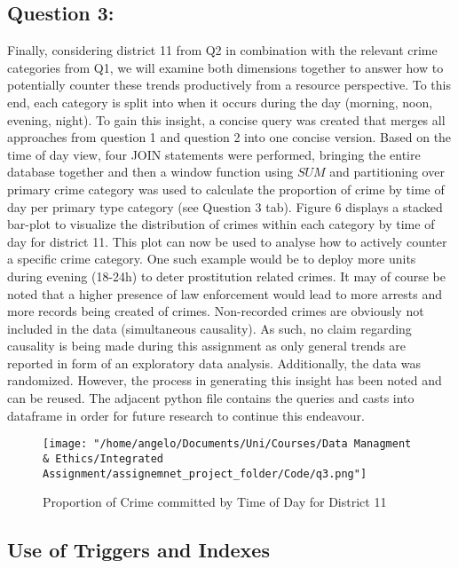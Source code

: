 \documentclass[a4paper]{article}
\begin{document}
 



\subsection{Question 3:}



Finally, considering district 11 from Q2 in combination with the relevant crime categories from Q1, we will examine both dimensions together to answer how to potentially counter these trends productively from a resource perspective. To this end, each category is split into when it occurs during the day (morning, noon, evening, night).
To gain this insight, a concise query was created that merges all approaches from question 1 and question 2 into one concise version. Based on the time of day view, four JOIN statements were performed, bringing the entire database together and then a window function using $SUM$ and partitioning over primary crime category was used to calculate the proportion of crime by time of day per primary type category (see Question 3 tab).
Figure 6 displays a stacked bar-plot to visualize the distribution of crimes within each category by time of day for district 11. This plot can now be used to analyse how to actively counter a specific crime category. One such example would be to deploy more units during evening (18-24h) to deter prostitution related crimes. It may of course be noted that a higher presence of law enforcement would lead to more arrests and more records being created of crimes. Non-recorded crimes are obviously not included in the data (simultaneous causality). As such, no claim regarding causality is being made during this assignment as only general trends are reported in form of an exploratory data analysis. Additionally, the data was randomized. However, the process in generating this insight has been noted and can be reused. The adjacent python file contains the queries and casts into dataframe in order for future research to continue this endeavour. 


\begin{figure}[htp]
		\centering
			\texttt{[image: "/home/angelo/Documents/Uni/Courses/Data Managment \& Ethics/Integrated Assignment/assignemnet\_project\_folder/Code/q3.png"]}
         \small
         \caption{Proportion of Crime committed by Time of Day for District 11}
\end{figure}



\subsection{Use of Triggers and Indexes}
\end{document}
